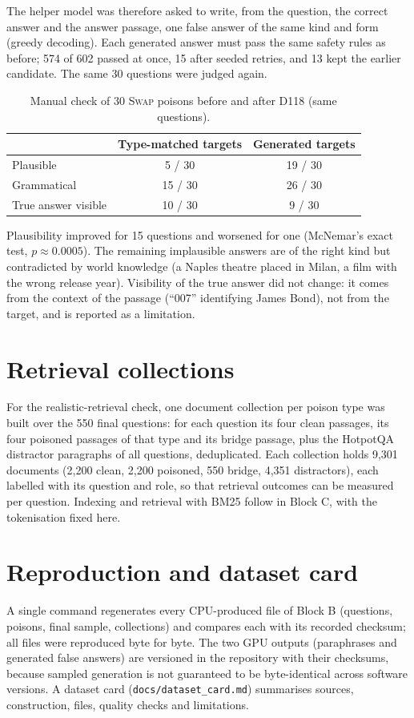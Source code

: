\documentclass[11pt,a4paper]{report}
\begin{document}
The helper model was therefore asked to write, from the question, the correct
answer and the answer passage, one false answer of the same kind and form
(greedy decoding). Each generated answer must pass the same safety rules as
before; 574 of 602 passed at once, 15 after seeded retries, and 13 kept the
earlier candidate. The same 30 questions were judged again.

\begin{table}[h]
\centering\small
\begin{tabular}{@{}lcc@{}}
\toprule
& Type-matched targets & Generated targets \\
\midrule
Plausible & 5 / 30 & 19 / 30 \\
Grammatical & 15 / 30 & 26 / 30 \\
True answer visible & 10 / 30 & 9 / 30 \\
\bottomrule
\end{tabular}
\caption{Manual check of 30 \textsc{Swap} poisons before and after D118
(same questions).}
\label{tab:b4-plausibility}
\end{table}

Plausibility improved for 15 questions and worsened for one (McNemar's exact
test, $p \approx 0.0005$). The remaining implausible answers are of the right
kind but contradicted by world knowledge (a Naples theatre placed in Milan, a
film with the wrong release year). Visibility of the true answer did not change:
it comes from the context of the passage (``007'' identifying James Bond), not
from the target, and is reported as a limitation.
\section{Retrieval collections}\label{sec:b4-bm25}
For the realistic-retrieval check, one document collection per poison type
was built over the 550 final questions: for each question its four clean
passages, its four poisoned passages of that type and its bridge passage,
plus the HotpotQA distractor paragraphs of all questions, deduplicated. Each
collection holds 9{,}301 documents (2{,}200 clean, 2{,}200 poisoned, 550
bridge, 4{,}351 distractors), each labelled with its question and role, so
that retrieval outcomes can be measured per question. Indexing and retrieval
with BM25 follow in Block C, with the tokenisation fixed here.

\section{Reproduction and dataset card}\label{sec:b4-repro}
A single command regenerates every CPU-produced file of Block B (questions,
poisons, final sample, collections) and compares each with its recorded
checksum; all files were reproduced byte for byte. The two GPU outputs
(paraphrases and generated false answers) are versioned in the repository
with their checksums, because sampled generation is not guaranteed to be
byte-identical across software versions. A dataset card
(\texttt{docs/dataset\_card.md}) summarises sources, construction, files,
quality checks and limitations.
\end{document}
